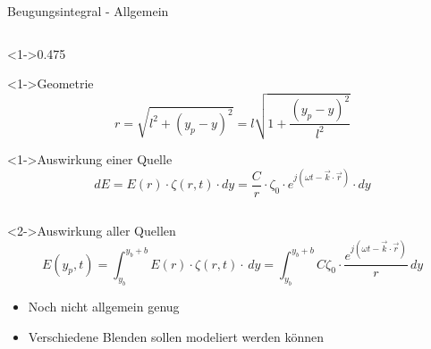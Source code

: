 \begin{frame}{Beugungsintegral - Allgemein}
\begin{columns}
        \begin{column}<1->{0.475\textwidth}
            \begin{block}<1->{Geometrie}
                \begin{equation*}
                    r
                    =
                    \sqrt{l^2 + (y_p-y)^2}
                    =
                    l \sqrt{1 + \frac{(y_p-y)^2}{l^2}}
                \end{equation*}
            \end{block}
            \begin{block}<1->{Auswirkung einer Quelle}
                \begin{equation*}
                    dE
                    =
                    E(r) \cdot \zeta(r, t) \cdot dy
                    =
                    \frac{C}{r} \cdot \zeta_0 \cdot e^{j(\omega t - \vec{k}\cdot\vec{r})} \cdot dy
                \end{equation*}
            \end{block}
        \end{column}
    \end{columns}
    \begin{block}<2->{Auswirkung aller Quellen}
        \begin{equation*}
            E(y_p, t)
            =
            \int_{y_b}^{y_b + b} E(r) \cdot \zeta(r, t) \cdot \,dy
            =
            \int_{y_b}^{y_b+b}C\zeta_0 \cdot \frac{e^{j(\omega t - \vec{k}\cdot\vec{r})}}{r} \,dy
        \end{equation*}
        \vspace*{-0.5\baselineskip}
        \begin{itemize}
            \item<3-> Noch nicht allgemein genug
            \item<4-> Verschiedene Blenden sollen modeliert werden können
        \end{itemize}
    \end{block}
\end{frame}

